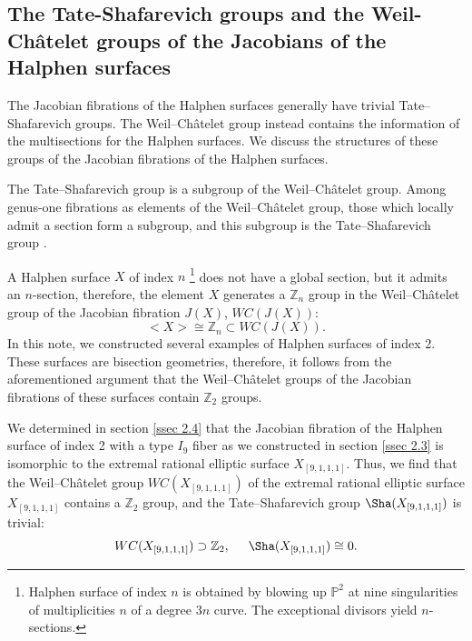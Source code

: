 \documentclass[12pt]{article}
\def\Z{\mathbb{Z}}
\def\P{\mathbb{P}}
\begin{document}
\subsection{The Tate-Shafarevich groups and the Weil-Ch\^{a}telet groups of the Jacobians of the Halphen surfaces}
\label{ssec 2.5}
\par The Jacobian fibrations of the Halphen surfaces generally have trivial Tate--Shafarevich groups. The Weil--Ch\^{a}telet group instead contains the information of the multisections for the Halphen surfaces. We discuss the structures of these groups of the Jacobian fibrations of the Halphen surfaces. 
\par The Tate--Shafarevich group is a subgroup of the Weil--Ch\^{a}telet group. Among genus-one fibrations as elements of the Weil--Ch\^{a}telet group, those which locally admit a section form a subgroup, and this subgroup is the Tate--Shafarevich group \cite{Cas}. 
\par A Halphen surface $X$ of index $n$ \footnote{Halphen surface of index $n$ is obtained by blowing up $\P^2$ at nine singularities of multiplicities $n$ of a degree $3n$ curve. The exceptional divisors yield $n$-sections.} does not have a global section, but it admits an $n$-section, therefore, the element $X$ generates a $\Z_n$ group in the Weil--Ch\^{a}telet group of the Jacobian fibration $J(X)$, $WC(J(X))$:
\begin{equation}
<X>\cong\Z_n\subset WC(J(X)).
\end{equation}
In this note, we constructed several examples of Halphen surfaces of index 2. These surfaces are bisection geometries, therefore, it follows from the aforementioned argument that the Weil--Ch\^{a}telet groups of the Jacobian fibrations of these surfaces contain $\Z_2$ groups.
\par We determined in section \ref{ssec 2.4} that the Jacobian fibration of the Halphen surface of index 2 with a type $I_9$ fiber as we constructed in section \ref{ssec 2.3} is isomorphic to the extremal rational elliptic surface $X_{[9, 1, 1, 1]}$. Thus, we find that the Weil--Ch\^{a}telet group $WC(X_{[9, 1, 1, 1]})$ of the extremal rational elliptic surface $X_{[9, 1, 1, 1]}$ contains a $\Z_2$ group, and the Tate--Shafarevich group $\Sha(X_{[9, 1, 1, 1]})$ is trivial:
\begin{equation}
WC(X_{[9, 1, 1, 1]})\supset\Z_2, \hspace{5mm} \Sha(X_{[9, 1, 1, 1]})\cong 0.
\end{equation}
\end{document}
